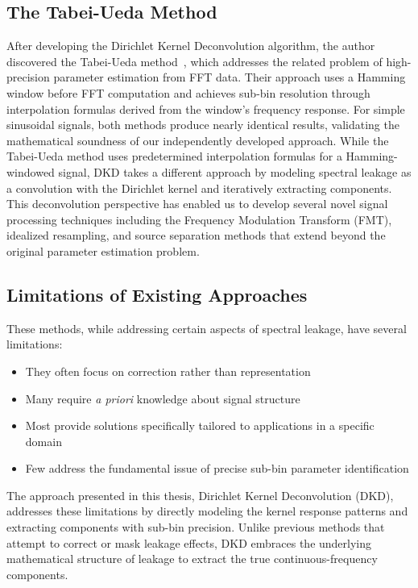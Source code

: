 \documentclass[11pt,twoside]{report}
\numberwithin{thm}{section}
\numberwithin{equation}{section}
\begin{document}
\subsection{The Tabei-Ueda Method}
After developing the Dirichlet Kernel Deconvolution algorithm, the author discovered the Tabei-Ueda method~\cite{tabei1987high}, which addresses the related problem of high-precision parameter estimation from FFT data. Their approach uses a Hamming window before FFT computation and achieves sub-bin resolution through interpolation formulas derived from the window's frequency response. For simple sinusoidal signals, both methods produce nearly identical results, validating the mathematical soundness of our independently developed approach.
While the Tabei-Ueda method uses predetermined interpolation formulas for a Hamming-windowed signal, DKD takes a different approach by modeling spectral leakage as a convolution with the Dirichlet kernel and iteratively extracting components. This deconvolution perspective has enabled us to develop several novel signal processing techniques including the Frequency Modulation Transform (FMT), idealized resampling, and source separation methods that extend beyond the original parameter estimation problem.

\subsection{Limitations of Existing Approaches}

These methods, while addressing certain aspects of spectral leakage, have several limitations:
\begin{itemize}
    \item They often focus on correction rather than representation
    \item Many require \textit{a priori} knowledge about signal structure
    \item Most provide solutions specifically tailored to applications in a specific domain
    \item Few address the fundamental issue of precise sub-bin parameter identification
\end{itemize}

The approach presented in this thesis, Dirichlet Kernel Deconvolution (DKD), addresses these limitations by directly modeling the kernel response patterns and extracting components with sub-bin precision. Unlike previous methods that attempt to correct or mask leakage effects, DKD embraces the underlying mathematical structure of leakage to extract the true continuous-frequency components.
\end{document}
